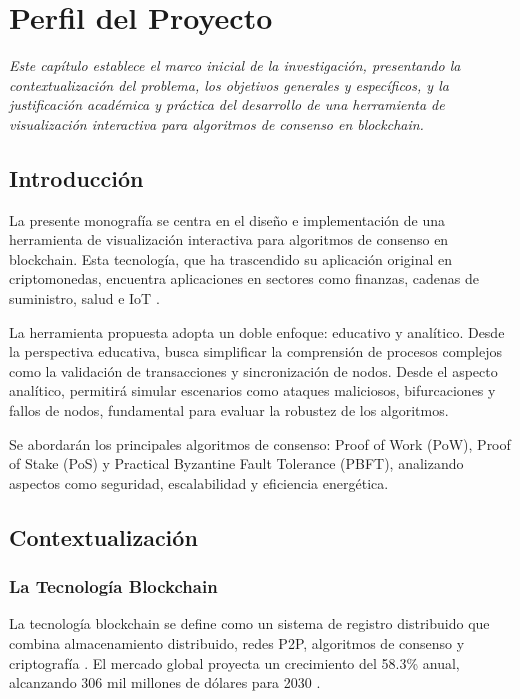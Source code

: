\documentclass[spanish,12pt,letterpaper]{report}
\begin{document}
\newpage

\pagestyle{plain} %
\tableofcontents
\newpage
\pagestyle{fancy}
\listoftables
\newpage

\pagestyle{fancy}

\chapter{Perfil del Proyecto}

\textit{Este capítulo establece el marco inicial de la investigación, presentando la contextualización del problema, los objetivos generales y específicos, y la justificación académica y práctica del desarrollo de una herramienta de visualización interactiva para algoritmos de consenso en blockchain.}
\newpage

\section{Introducción}
La presente monografía se centra en el diseño e implementación de una herramienta de visualización interactiva para algoritmos de consenso en blockchain. Esta tecnología, que ha trascendido su aplicación original en criptomonedas, encuentra aplicaciones en sectores como finanzas, cadenas de suministro, salud e IoT \parencite{businesswire2025blockchain}.

La herramienta propuesta adopta un doble enfoque: educativo y analítico. Desde la perspectiva educativa, busca simplificar la comprensión de procesos complejos como la validación de transacciones y sincronización de nodos. Desde el aspecto analítico, permitirá simular escenarios como ataques maliciosos, bifurcaciones y fallos de nodos, fundamental para evaluar la robustez de los algoritmos.

Se abordarán los principales algoritmos de consenso: Proof of Work (PoW), Proof of Stake (PoS) y Practical Byzantine Fault Tolerance (PBFT), analizando aspectos como seguridad, escalabilidad y eficiencia energética.

\section{Contextualización}
\subsection{La Tecnología Blockchain}
La tecnología blockchain se define como un sistema de registro distribuido que combina almacenamiento distribuido, redes P2P, algoritmos de consenso y criptografía \parencite{odu20255g}. El mercado global proyecta un crecimiento del 58.3\% anual, alcanzando 306 mil millones de dólares para 2030 \parencite{businesswire2025blockchain}.
\end{document}
